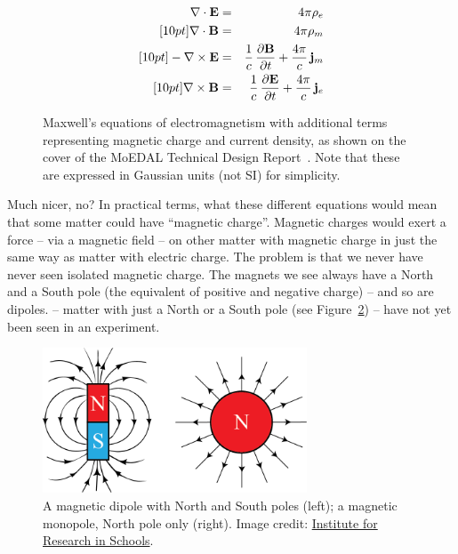\begin{figure}[htbp]
  \centering
\begin{eqnarray}
\label{eq:1m} \mathbf{\nabla} \cdot \mathbf{E} & = & 4 \pi \rho_{e}\\ [10pt]
\label{eq:2m} \mathbf{\nabla} \cdot \mathbf{B} & = & 4 \pi \rho_{m}\\ [10pt]
\label{eq:3m} - \mathbf{\nabla} \times \mathbf{E} & = & \frac{1}{c} \, \frac{\partial \mathbf{B}}{\partial t} + \frac{4 \pi}{c} \, \mathbf{j}_{m}\\ [10pt]
\label{eq:4m}   \mathbf{\nabla} \times \mathbf{B} & = & \frac{1}{c} \, \frac{\partial \mathbf{E}}{\partial t} + \frac{4 \pi}{c} \, \mathbf{j}_{e}
\end{eqnarray}
  \caption[Maxwell's equations of electromagnetism with magnetic charge]
  {\label{fig:maxwellseqsmagcharge}Maxwell's equations of electromagnetism with additional terms representing magnetic charge and current density, as shown on the cover of the MoEDAL Technical Design Report~\cite{MoEDAL2009}. Note that these are expressed in Gaussian units (not SI) for simplicity.}
\end{figure}

Much nicer, no? In practical terms, what these different equations would
mean that some matter could have ``magnetic charge''.
Magnetic charges would exert a force -- via a magnetic field -- on
other matter with magnetic charge in just the same way as matter
with electric charge.
The problem is that we never have never seen isolated magnetic charge.
The magnets we see always have a North and a South pole
(the equivalent of positive and negative charge) -- and so are dipoles.
 -- matter with just a North or a
South pole (see Figure~\ref{fig:dipolemonopole}) -- have not yet
been seen in an experiment.

%
\begin{figure}[htbp]
  \centering
  \includegraphics[width=0.7\textwidth]{assets/images/dipole-vs-monopole/dipole-vs-monopole.png}
  \caption[A magnetic dipole and monopole]
  {\label{fig:dipolemonopole}A magnetic dipole with North and South poles (left); a magnetic monopole, North pole only (right).  Image credit: \href{http://researchinschools.org}{Institute for Research in Schools}.}
\end{figure}
%

